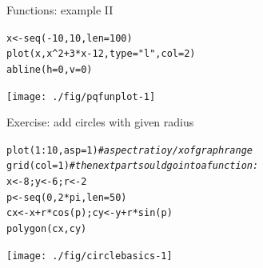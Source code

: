 \documentclass[xcolor=table,       handout,    xcolor=dvipsnames]{beamer}\usepackage[]{graphicx}\usepackage[]{color}
\makeatletter
\newcommand{\hlnum}[1]{\textcolor[rgb]{0,0,0}{#1}}
\newcommand{\hlstr}[1]{\textcolor[rgb]{0.545,0.137,0.137}{#1}}
\newcommand{\hlcom}[1]{\textcolor[rgb]{0,0.392,0}{\textit{#1}}}
\newcommand{\hlopt}[1]{\textcolor[rgb]{0,0,0}{#1}}
\newcommand{\hlstd}[1]{\textcolor[rgb]{0,0,0}{#1}}
\newcommand{\hlkwb}[1]{\textcolor[rgb]{0,0,0}{#1}}
\newcommand{\hlkwc}[1]{\textcolor[rgb]{1,0,1}{#1}}
\newcommand{\hlkwd}[1]{\textcolor[rgb]{0,0,1}{#1}}
\newenvironment{kframe}{%
 \def\at@end@of@kframe{}%
 \ifinner\ifhmode%
  \def\at@end@of@kframe{\end{minipage}}%
  \begin{minipage}{\columnwidth}%
 \fi\fi%
 \def\FrameCommand##1{\hskip\@totalleftmargin \hskip-\fboxsep
 \colorbox{shadecolor}{##1}\hskip-\fboxsep
     \hskip-\linewidth \hskip-\@totalleftmargin \hskip\columnwidth}%
 \MakeFramed {\advance\hsize-\width
   \@totalleftmargin\z@ \linewidth\hsize
   \@setminipage}}%
 {\par\unskip\endMakeFramed%
 \at@end@of@kframe}
\newenvironment{knitrout}{}{} %
\makeatother
\begin{document}

\begin{frame}[fragile]{Functions: example II}
\begin{knitrout}
\color{fgcolor}\begin{kframe}
\begin{alltt}
\hlstd{x} \hlkwb{<-} \hlkwd{seq}\hlstd{(}\hlopt{-}\hlnum{10}\hlstd{,} \hlnum{10}\hlstd{,} \hlkwc{len}\hlstd{=}\hlnum{100}\hlstd{)}
\hlkwd{plot}\hlstd{(x,  x}\hlopt{^}\hlnum{2} \hlopt{+}\hlnum{3}\hlopt{*}\hlstd{x} \hlopt{-}\hlnum{12}\hlstd{,} \hlkwc{type}\hlstd{=}\hlstr{"l"}\hlstd{,} \hlkwc{col}\hlstd{=}\hlnum{2}\hlstd{)}
\hlkwd{abline}\hlstd{(}\hlkwc{h}\hlstd{=}\hlnum{0}\hlstd{,} \hlkwc{v}\hlstd{=}\hlnum{0}\hlstd{)}
\end{alltt}
\end{kframe}

{\centering \texttt{[image: ./fig/pqfunplot-1]} 

}



\end{knitrout}
\end{frame}


\begin{frame}[fragile]{Exercise: add circles with given radius}
\begin{knitrout}
\color{fgcolor}\begin{kframe}
\begin{alltt}
\hlkwd{plot}\hlstd{(}\hlnum{1}\hlopt{:}\hlnum{10}\hlstd{,} \hlkwc{asp}\hlstd{=}\hlnum{1}\hlstd{)} \hlcom{# aspect ratio y/x of graph range}
\hlkwd{grid}\hlstd{(}\hlkwc{col}\hlstd{=}\hlnum{1}\hlstd{)} \hlcom{# the next part sould go into a function:}
\hlstd{x} \hlkwb{<-} \hlnum{8} \hlstd{;  y} \hlkwb{<-} \hlnum{6} \hlstd{;  r} \hlkwb{<-}\hlnum{2}
\hlstd{p} \hlkwb{<-} \hlkwd{seq}\hlstd{(}\hlnum{0}\hlstd{,} \hlnum{2}\hlopt{*}\hlstd{pi,} \hlkwc{len}\hlstd{=}\hlnum{50}\hlstd{)}
\hlstd{cx} \hlkwb{<-} \hlstd{x}\hlopt{+}\hlstd{r}\hlopt{*}\hlkwd{cos}\hlstd{(p) ;  cy} \hlkwb{<-} \hlstd{y}\hlopt{+}\hlstd{r}\hlopt{*}\hlkwd{sin}\hlstd{(p)}
\hlkwd{polygon}\hlstd{(cx, cy)}
\end{alltt}
\end{kframe}

{\centering \texttt{[image: ./fig/circlebasics-1]} 

}



\end{knitrout}
\end{frame}
\end{document}
